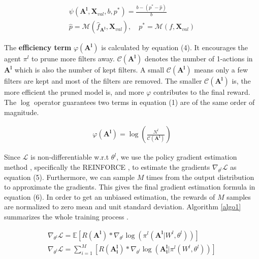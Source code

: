 \documentclass[10pt,twocolumn,letterpaper]{article}
\begin{document}
 \begin{gather}
    \psi(\mathbf{A^l}, \mathbf{X}_{val}, b, p^*) = \frac{ b - (p^* - \hat{p})}{b} \\
    \hat{p} = \mathcal{M}(\hat{f}_{\mathbf{A^l}},\mathbf{X}_{val}), \quad  p^* = \mathcal{M}(f, \mathbf{X}_{val})
\end{gather}


The \textbf{efficiency term} $\varphi(\mathbf{A^l})$ is calculated by equation (4). It encourages the agent $\pi^l$ to prune more filters away. $\mathcal{C}(\mathbf{A^l}) $ denotes the number of 1-actions in $\mathbf{A^l}$ which is also the number of kept filters. A small $\mathcal{C}(\mathbf{A^l}) $ means only a few filters are kept and most of the filters are removed. The smaller $\mathcal{C}(\mathbf{A^l}) $ is, the more efficient the pruned model is, and more $\varphi$ contributes to the final reward. The $\log$ operator guarantees two terms in equation (1) are of the same order of magnitude.

 \begin{gather}
   \varphi(\mathbf{A^l}) = \log( \frac{N^l}{ \mathcal{C}(\mathbf{A^l}) } )
\end{gather}


Since $\mathcal{L}$ is non-differentiable w.r.t $\theta^l$, we use the policy gradient estimation method \cite{pg}, specifically the REINFORCE \cite{reinforce}, to estimate the gradients $\nabla_{\theta^l}\mathcal{L}$ as equation (5). Furthermore, we can sample $M$ times from the output distribution to approximate the gradients. This gives the final gradient estimation formula in equation (6). In order to get an unbiased estimation, the rewards of $M$ samples are normalized to zero mean and unit standard deviation. Algorithm \ref{algo1} summarizes the whole training process .


 \begin{gather}
    \nabla_{\theta^l}\mathcal{L} = \mathbb{E}[R(\mathbf{A^l}) * \nabla_{\theta^l} \log(\pi^l(\mathbf{A^l}|W^l, \theta^l))] \\
    \nabla_{\theta^l}\mathcal{L} = \sum_{i=1}^{M}[ R(\mathbf{A_i^l} ) * \nabla_{\theta^l} \log( \mathbf{A_i^l}  | \pi^l(W^l,\theta^l)) ]
\end{gather}

\end{document}
